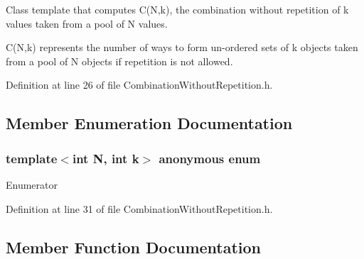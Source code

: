 Class template that computes C(\+N,k), the combination without repetition of k values taken from a pool of N values.

C(\+N,k) represents the number of ways to form un-\/ordered sets of k objects taken from a pool of N objects if repetition is not allowed. 

Definition at line 26 of file Combination\+Without\+Repetition.\+h.



\subsection{Member Enumeration Documentation}
\hypertarget{structmodel_1_1_combination_without_repetition_ad193fd879d424233f86d62ce25775207}{}\subsubsection[{anonymous enum}]{\setlength{\rightskip}{0pt plus 5cm}template$<$int N, int k$>$ anonymous enum}\label{structmodel_1_1_combination_without_repetition_ad193fd879d424233f86d62ce25775207}
\begin{Desc}
\item[Enumerator]\par
\begin{description}
\item[{\em 
\hypertarget{structmodel_1_1_combination_without_repetition_ad193fd879d424233f86d62ce25775207a73e92f4f1fc7e0071cda6ef63024e6d4}{}value\label{structmodel_1_1_combination_without_repetition_ad193fd879d424233f86d62ce25775207a73e92f4f1fc7e0071cda6ef63024e6d4}
}]\end{description}
\end{Desc}


Definition at line 31 of file Combination\+Without\+Repetition.\+h.



\subsection{Member Function Documentation}
\hypertarget{structmodel_1_1_combination_without_repetition_a117ca315f9f91486a79984a0d1b80f37}{}
